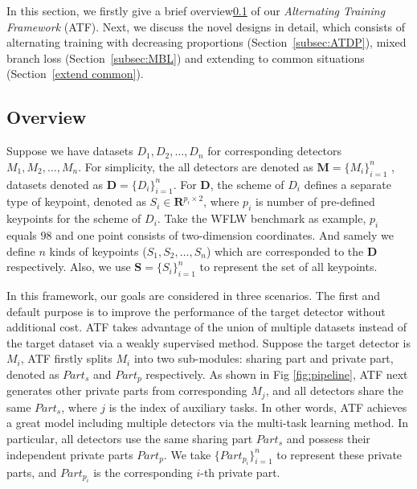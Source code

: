 \documentclass[journal,transmag]{IEEEtran}
\begin{document}
In this section, we firstly give a brief overview\ref{overview}  of our \emph{Alternating Training Framework} (ATF).
Next, we discuss the novel designs in detail, 
which consists of alternating training with decreasing proportions (Section~\ref{subsec:ATDP}), mixed branch loss (Section~\ref{subsec:MBL}) and extending to common situations (Section~\ref{extend common}).

\subsection{Overview}
\label{overview}
Suppose we have datasets $D_1, D_2, \dots, D_{n}$ for corresponding detectors $M_1, M_2, \dots, M_{n}$.
For simplicity, the all detectors are denoted as $\mathbf{M} = \{M_i\}_{i=1}^n$ , datasets denoted as $\mathbf{D} = \{D_i\}_{i=1}^n$.
For $\mathbf{D}$, the scheme of $D_i$ defines  a separate type of keypoint, denoted as $S_i \in \mathbf{R}^{p_i\times 2}$, 
where  $p_i$ is number of pre-defined keypoints for the scheme of $D_i$.
Take the WFLW\cite{LABWFLW} benchmark as example, $p_i$ equals $98$ and one point consists of two-dimension coordinates.
And samely we define $n$ kinds of keypoints ($S_1, S_2, \dots , S_n$) which are corresponded to the $\mathbf{D}$ respectively.
Also, we use  $ \mathbf{S} = \{ S_i \}_{i=1}^n$  to represent the set of all keypoints.


In this framework, our goals are considered in three scenarios.
The first and default purpose is to improve the performance of the target detector without additional cost.
ATF takes advantage of the union of multiple datasets instead of the target dataset via a weakly supervised method.
Suppose the target detector is $M_i$, ATF firstly splits $M_i$ into two sub-modules: sharing part and private part, denoted as $Part_s$ and $Part_p$ respectively. 
As shown in Fig \ref{fig:pipeline}, ATF next generates other private parts from corresponding $M_j$, and all detectors share the same $Part_s$, where $j$ is the index of auxiliary tasks.
In other words, ATF achieves a great model including multiple detectors via the multi-task learning method.
In particular, all detectors use the same sharing part $Part_s$ and possess their independent private parts $Part_p$.
We take  $\{ Part_{p_i} \}_{i=1}^n$ to represent these private parts, and $Part_{p_i}$ is the corresponding $i$-th private part.
\end{document}
